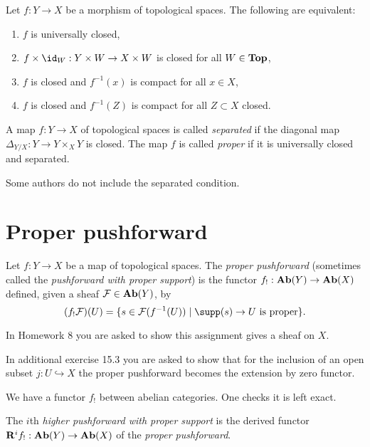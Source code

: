 \begin{prop}
	Let $f: Y \to X$ be a morphism of topological spaces. The following are equivalent: 
	\begin{enumerate}
    	\item $f$ is universally closed,
		\item $f \times \id_W: Y \times W \to X \times W$ is closed for all $W \in \mathbf{Top}$,
		\item $f$ is closed and $f^{-1}(x)$ is compact for all $x \in X$,
		\item $f$ is closed and $f^{-1}(Z)$ is compact for all $Z \subset X$ closed. 
    \end{enumerate}
\end{prop}

\begin{defn}
	A map $f: Y \to X$ of topological spaces is called \emph{separated} if the diagonal map $
    	\Delta_{Y/X}: Y \to Y\times_X Y
    $ is closed. The map $f$ is called \emph{proper} if it is universally closed and separated. 
\end{defn}
\begin{rmk}
	Some authors do not include the separated condition.
\end{rmk}

\section{Proper pushforward}

\begin{defn}
	Let $f: Y \to X$ be a map of topological spaces. The \emph{proper pushforward} (sometimes called the \emph{pushforward with proper support}) is the functor $f_{!}: \operatorname{\mathbf{Ab}}(Y) \to \operatorname{\mathbf{Ab}}(X)$ defined, given a sheaf $\mathcal{F} \in \operatorname{\mathbf{Ab}}(Y)$, by \[
		(f_{!}\sh{F})(U) = \{s \in \sh{F}(f^{-1}(U)) \mid \supp(s) \to U \text{ is proper}\}.
    \]
\end{defn}
\begin{rmk}
	In Homework 8 you are asked to show this assignment gives a sheaf on $X$. 
\end{rmk}
\begin{exc}
	In additional exercise 15.3 you are asked to show that for the inclusion of an open subset $j: U \hookrightarrow X$ the proper pushforward becomes the extension by zero functor. 
\end{exc}
We have a functor $f_!$ between abelian categories. One checks it is left exact. 
\begin{defn}
	The $i$th \emph{higher pushforward with proper support} is the derived functor $\mathbf{R}^if_!: \operatorname{\mathbf{Ab}}(Y) \to \operatorname{\mathbf{Ab}}(X)$ of the \emph{proper pushforward}. 
\end{defn}

